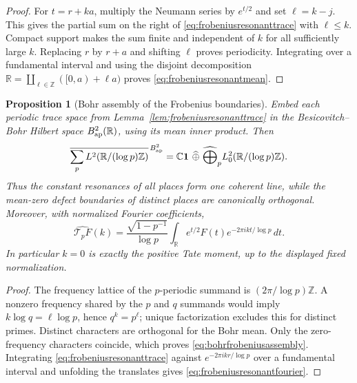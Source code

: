 \documentclass[11pt]{amsart}
\newtheorem{proposition}[theorem]{Proposition}
\theoremstyle{definition}
\theoremstyle{remark}
\begin{document}
\begin{proof}
For $t=r+ka$, multiply the Neumann series by $e^{t/2}$ and set
$\ell=k-j$.  This gives the partial sum on the right of
\eqref{eq:frobeniusresonanttrace} with $\ell\le k$.  Compact support makes
the sum finite and independent of $k$ for all sufficiently large $k$.
Replacing $r$ by $r+a$ and shifting $\ell$ proves periodicity.  Integrating
over a fundamental interval and using the disjoint decomposition
$\mathbb R=\coprod_{\ell\in\mathbb Z}([0,a)+\ell a)$ proves
\eqref{eq:frobeniusresonantmean}.
\end{proof}

\begin{proposition}[Bohr assembly of the Frobenius boundaries]
\label{prop:bohrfrobeniusassembly}
Embed each periodic trace space from
Lemma~\ref{lem:frobeniusresonanttrace} in the Besicovitch--Bohr Hilbert
space $B^2_{\rm ap}(\mathbb R)$, using its mean inner product.  Then
\begin{equation}\label{eq:bohrfrobeniusassembly}
 \overline{\sum_p L^2(\mathbb R/(\log p)\mathbb Z)}^{\,B^2_{\rm ap}}
 =\mathbb C\mathbf1\ \widehat\oplus\
   \widehat\bigoplus_p
       L^2_0(\mathbb R/(\log p)\mathbb Z).
\end{equation}
Thus the constant resonances of all places form one coherent line, while
the mean-zero defect boundaries of distinct places are canonically
orthogonal.  Moreover, with normalized Fourier coefficients,
\begin{equation}\label{eq:frobeniusresonantfourier}
 \widehat{\mathcal T_pF}(k)
 =\frac{\sqrt{1-p^{-1}}}{\log p}
   \int_{\mathbb R}e^{t/2}F(t)
       e^{-2\pi ikt/\log p}\,dt .
\end{equation}
In particular $k=0$ is exactly the positive Tate moment, up to the displayed
fixed normalization.
\end{proposition}

\begin{proof}
The frequency lattice of the $p$-periodic summand is
$(2\pi/\log p)\mathbb Z$.  A nonzero frequency shared by the $p$ and $q$
summands would imply $k\log q=\ell\log p$, hence $q^k=p^\ell$; unique
factorization excludes this for distinct primes.  Distinct characters are
orthogonal for the Bohr mean.  Only the zero-frequency characters coincide,
which proves \eqref{eq:bohrfrobeniusassembly}.  Integrating
\eqref{eq:frobeniusresonanttrace} against
$e^{-2\pi ikr/\log p}$ over a fundamental interval and unfolding the
translates gives \eqref{eq:frobeniusresonantfourier}.
\end{proof}
\end{document}
